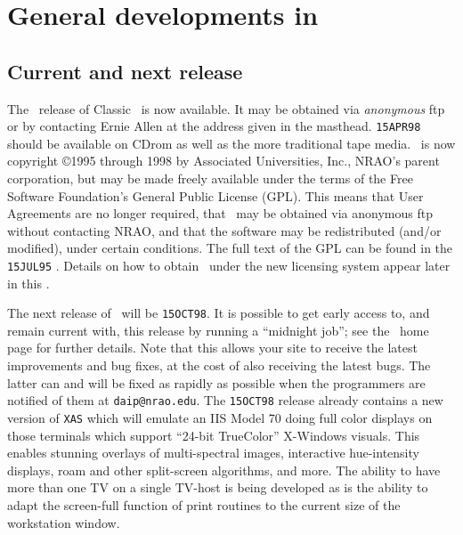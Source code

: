 


\newcommand{\MYSpace}{-11pt}

\normalstyle

\section{General developments in \AIPS}

\subsection{Current and next release}

The \AIPRELEASE\ release of Classic \AIPS\ is now available.  It may
be obtained via \emph{anonymous} ftp or by contacting Ernie Allen at
the address given in the masthead.  {\tt 15APR98} should be available
on CDrom as well as the more traditional tape media.  \AIPS\ is now
copyright \copyright 1995 through 1998 by Associated Universities,
Inc., NRAO's parent corporation, but may be made freely available
under the terms of the Free Software Foundation's General Public
License \hbox{(GPL)}.  This means that User Agreements are no longer
required, that \AIPS\ may be obtained via anonymous ftp without
contacting NRAO, and that the software may be redistributed (and/or
modified), under certain conditions.  The full text of the GPL can be
found in the \texttt{15JUL95} \Aipsletter. Details on how to obtain
\AIPS\ under the new licensing system appear later in this
\Aipsletter.

The next release of \AIPS\ will be \texttt{15OCT98}.  It is possible
to get early access to, and remain current with, this release by
running a ``midnight job''; see the \AIPS\ home page for further
details.  Note that this allows your site to receive the latest
improvements and bug fixes, at the cost of also receiving the latest
bugs.  The latter can and will be fixed as rapidly as possible when
the programmers are notified of them at \texttt{daip@nrao.edu}.  The
\texttt{15OCT98} release already contains a new version of
\texttt{XAS} which will emulate an IIS Model 70 doing full color
displays on those terminals which support ``24-bit TrueColor''
X-Windows visuals.  This enables stunning overlays of multi-spectral
images, interactive hue-intensity displays, roam and other
split-screen algorithms, and more.  The ability to have more than one
TV on a single TV-host is being developed as is the ability to adapt
the screen-full function of print routines to the current size of the
workstation window.

